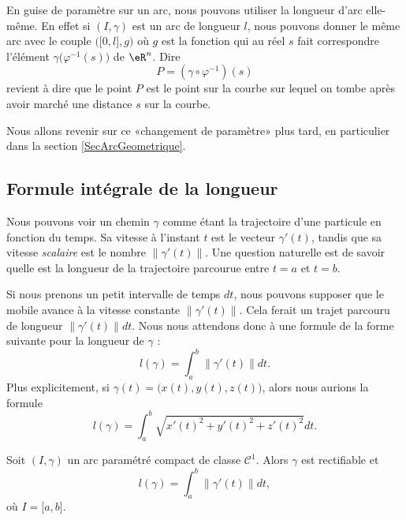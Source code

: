 En guise de paramètre sur un arc, nous pouvons utiliser la longueur d'arc elle-même. En effet si $(I,\gamma)$ est un arc de longueur $l$, nous pouvons donner le même arc avec le couple $\big( \mathopen[ 0 , l \mathclose],g \big)$ où $g$ est la fonction qui au réel $s$ fait correspondre l'élément $\gamma\big( \varphi^{-1}(s) \big)$ de $\eR^n$. Dire
\begin{equation}
    P=(\gamma\circ\varphi^{-1})(s)
\end{equation}
revient à dire que le point $P$ est le point sur la courbe sur lequel on tombe après avoir marché une distance $s$ sur la courbe.

Nous allons revenir sur ce «changement de paramètre» plus tard, en particulier dans la section \ref{SecArcGeometrique}.

\subsection{Formule intégrale de la longueur}

Nous pouvons voir un chemin $\gamma$ comme étant la trajectoire d'une particule en fonction du temps. Sa vitesse à l'instant $t$ est le vecteur $\gamma'(t)$, tandis que sa vitesse \emph{scalaire} est le nombre $\| \gamma'(t) \|$. Une question naturelle est de savoir quelle est la longueur de la trajectoire parcourue entre $t=a$ et $t=b$.

Si nous prenons un petit intervalle de temps $dt$, nous pouvons supposer que le mobile avance à la vitesse constante $\| \gamma'(t) \|$. Cela ferait un trajet parcouru de longueur $\| \gamma'(t) \|dt$. Nous nous attendons donc à une formule de la forme suivante pour la longueur de \( \gamma\) :
\begin{equation}        \label{EqDefLongueurChemin}
    l(\gamma)=\int_a^b\| \gamma'(t) \|dt.
\end{equation}
Plus explicitement, si $\gamma(t)=\big( x(t),y(t),z(t) \big)$, alors nous aurions la formule
\begin{equation}
    l(\gamma)=\int_a^b\sqrt{x'(t)^2+y'(t)^2+z'(t)^2}dt.
\end{equation}


\begin{theorem}     \label{ThoLongueurIntegrale}
    Soit $(I,\gamma)$ un arc paramétré compact de classe $\mathcal{C}^1$. Alors $\gamma$ est rectifiable et
    \begin{equation}        \label{EqLongGammalInt}
        l(\gamma)=\int_a^b\| \gamma'(t) \|dt,
    \end{equation}
    où $I=\mathopen[ a , b \mathclose]$.
\end{theorem}

